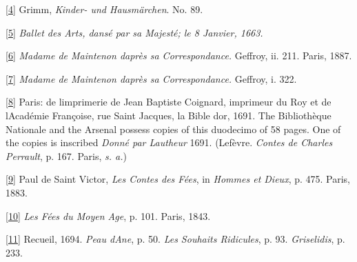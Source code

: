 \documentclass[14pt,a4paper]{memoir}
\begin{document}
\protect\hypertarget{4533318093929944247_33931-h-0.htm.xhtmlux5cux23Footnote_4}{}{}\protect\hyperlink{4533318093929944247_33931-h-0.htm.xhtmlux5cux23FNanchor_4}{{{[}4{]}}}
Grimm, \emph{Kinder- und Hausmärchen}. No. 89.

\protect\hypertarget{4533318093929944247_33931-h-0.htm.xhtmlux5cux23Footnote_5}{}{}\protect\hyperlink{4533318093929944247_33931-h-0.htm.xhtmlux5cux23FNanchor_5}{{{[}5{]}}}
\emph{Ballet des Arts, dansé par sa Majesté; le 8 Janvier, 1663.}

\protect\hypertarget{4533318093929944247_33931-h-0.htm.xhtmlux5cux23Footnote_6}{}{}\protect\hyperlink{4533318093929944247_33931-h-0.htm.xhtmlux5cux23FNanchor_6}{{{[}6{]}}}
\emph{Madame de Maintenon d\textquotesingle après sa Correspondance.}
Geffroy, ii. 211. Paris, 1887.

\protect\hypertarget{4533318093929944247_33931-h-0.htm.xhtmlux5cux23Footnote_7}{}{}\protect\hyperlink{4533318093929944247_33931-h-0.htm.xhtmlux5cux23FNanchor_7}{{{[}7{]}}}
\emph{Madame de Maintenon d\textquotesingle après sa Correspondance.}
Geffroy, i. 322.

\protect\hypertarget{4533318093929944247_33931-h-0.htm.xhtmlux5cux23Footnote_8}{}{}\protect\hyperlink{4533318093929944247_33931-h-0.htm.xhtmlux5cux23FNanchor_8}{{{[}8{]}}}
Paris: de l\textquotesingle imprimerie de Jean Baptiste Coignard,
imprimeur du Roy et de l\textquotesingle Académie Françoise, rue Saint
Jacques, la Bible d\textquotesingle or, 1691. The Bibliothèque Nationale
and the Arsenal possess copies of this duodecimo of 58 pages. One of the
copies is inscribed \emph{Donné par Lautheur} 1691. (Lefèvre.
\emph{Contes de Charles Perrault}, p. 167. Paris, \emph{s. a.})

\protect\hypertarget{4533318093929944247_33931-h-0.htm.xhtmlux5cux23Footnote_9}{}{}\protect\hyperlink{4533318093929944247_33931-h-0.htm.xhtmlux5cux23FNanchor_9}{{{[}9{]}}}
Paul de Saint Victor, \emph{Les Contes des Fées}, in \emph{Hommes et
Dieux}, p. 475. Paris, 1883.

\protect\hypertarget{4533318093929944247_33931-h-0.htm.xhtmlux5cux23Footnote_10}{}{}\protect\hyperlink{4533318093929944247_33931-h-0.htm.xhtmlux5cux23FNanchor_10}{{{[}10{]}}}
\emph{Les Fées du Moyen Age}, p. 101. Paris, 1843.

\protect\hypertarget{4533318093929944247_33931-h-0.htm.xhtmlux5cux23Footnote_11}{}{}\protect\hyperlink{4533318093929944247_33931-h-0.htm.xhtmlux5cux23FNanchor_11}{{{[}11{]}}}
Recueil, 1694. \emph{Peau d\textquotesingle Ane}, p. 50. \emph{Les
Souhaits Ridicules}, p. 93. \emph{Griselidis}, p. 233.
\end{document}

